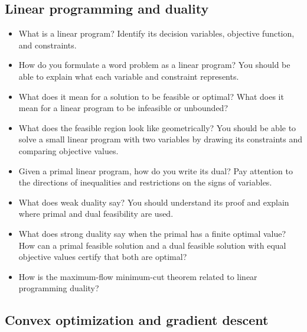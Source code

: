 \documentclass[11  pt]{exam}
\begin{document}
	\subsection{Linear programming and duality}
	\begin{itemize}

		\item What is a linear program? Identify its decision variables, objective function, and constraints.
		\item How do you formulate a word problem as a linear program? You should be able to explain what each variable and constraint represents.
		\item What does it mean for a solution to be feasible or optimal? What does it mean for a linear program to be infeasible or unbounded?
		\item What does the feasible region look like geometrically? You should be able to solve a small linear program with two variables by drawing its constraints and comparing objective values.
		\item Given a primal linear program, how do you write its dual?	Pay attention to the directions of inequalities and restrictions on the signs of variables.
		\item What does weak duality say? You should understand its proof and explain where primal and dual feasibility are used.
		\item What does strong duality say when the primal has a finite optimal value? How can a primal feasible solution and a dual feasible solution with equal objective values certify that both are optimal?
		\item How is the maximum-flow minimum-cut theorem related to linear programming duality?
	\end{itemize}

	\subsection{Convex optimization and gradient descent}
\end{document}
